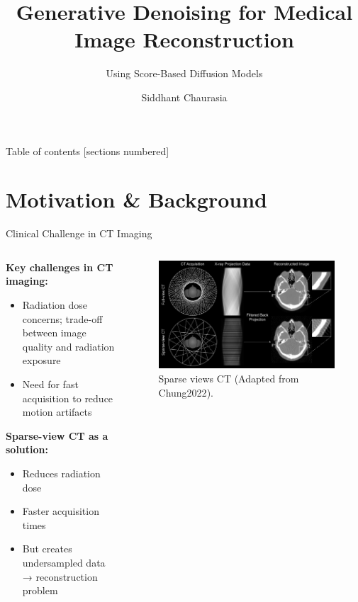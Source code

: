 \documentclass[10pt]{beamer}
\title{Generative Denoising for Medical Image Reconstruction}
\subtitle{Using Score-Based Diffusion Models}
\date{}
\author{Siddhant Chaurasia}
\begin{document}
\maketitle

\begin{frame}{Table of contents}
  [sections numbered]
  \tableofcontents
\end{frame}

\section{Motivation \& Background}

\begin{frame}{Clinical Challenge in CT Imaging}
  \begin{columns}[T]
    \begin{column}{0.6\textwidth}
      \textbf{Key challenges in CT imaging:}
      \begin{itemize}
        \item Radiation dose concerns; trade-off between image quality and radiation exposure
        \item Need for fast acquisition to reduce motion artifacts
      \end{itemize}

      \bigskip
      \textbf{Sparse-view CT as a solution:}
      \begin{itemize}
        \item Reduces radiation dose
        \item Faster acquisition times
        \item But creates undersampled data → reconstruction problem
      \end{itemize}
    \end{column}

    \begin{column}{0.4\textwidth}
        \begin{figure}
            \centering
            \includegraphics[width=1.1\textwidth]{ct.jpg}
            \caption{Sparse views CT (Adapted from Chung2022\cite{Chung2022}).}
        \end{figure}



\end{column}
\end{columns}
\end{frame}
\end{document}
